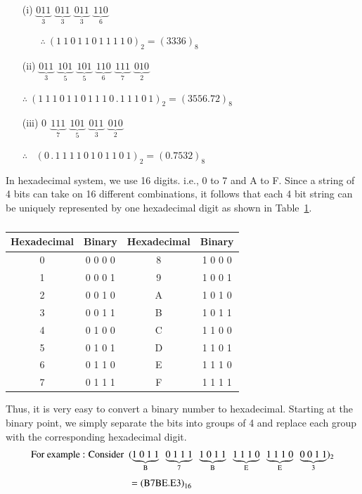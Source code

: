 \begin{solution}
\begin{itemize}
\item[(i)] $\underbrace{011}_{3} \ \ \underbrace{011}_{3} \ \ \underbrace{011}_{3} \ \ \underbrace{110}_{6}$

\smallskip
\qquad\quad~~~ $\therefore~ (1~1~0~1~1~0~1~1~1~1~0)_{2}=(3336)_{8}$

\item[(ii)] $\underbrace{011}_{3} \ \ \underbrace{101}_{5} \ \ \underbrace{101}_{5} \ \ \underbrace{110}_{6} \ \ \underbrace{111}_{7} \ \ \underbrace{010}_{2}$

\smallskip
$\therefore~ (1~1~1~0~1~1~0~1~1~1~0\,.\,1~1~1~0~1)_{2}=(3556.72)_{8}$

\item[(iii)] $0 \ \ \underbrace{111}_{7} \ \ \underbrace{101}_{5} \ \ \underbrace{011}_{3} \ \ \underbrace{010}_{2}$

\smallskip
$\therefore$~ $(0\,.\,1~1~1~1~0~1~0~1~1~0~1)_{2}=(0.7532)_{8}$
\end{itemize}
\end{solution}


In hexadecimal system, we use 16 digits. i.e., 0 to 7 and A to F. Since a string of 4 bits can take on 16 different combinations, it follows that each 4 bit string can be uniquely represented by one hexadecimal digit as shown in Table~\ref{tab5.2}.
\begin{table}[H]
\centering
\caption{}\label{tab5.2}
\renewcommand{\arraystretch}{1.2}
\tabcolsep=10pt
\begin{tabular}{|c|c|c|c|}
\hline
{\bf Hexadecimal} & {\bf Binary} & {\bf Hexadecimal} & {\bf Binary}\\[3pt]
\hline
0 & 0 0 0 0 & 8 & 1 0 0 0\\
1 & 0 0 0 1 & 9 & 1 0 0 1\\
2 & 0 0 1 0 & A & 1 0 1 0\\
3 & 0 0 1 1 & B & 1 0 1 1\\
4 & 0 1 0 0 & C & 1 1 0 0\\
5 & 0 1 0 1 & D & 1 1 0 1\\
6 & 0 1 1 0 & E & 1 1 1 0\\
7 & 0 1 1 1 & F & 1 1 1 1\\
\hline
\end{tabular}
\end{table}

Thus, it is very easy to convert a binary number to hexadecimal. Starting at the binary point, we simply separate the bits into groups of 4 and replace each group with the corresponding hexadecimal digit.
\begin{align*}
\text{For example~: Consider~ } & (\underbrace{1~0~1~1}_{\rmB} \ \ \underbrace{0~1~1~1}_{7} \ \ \underbrace{1~0~1~1}_{\rmB} \ \ \underbrace{1~1~1~0}_{\rmE} \ \ \underbrace{1~1~1~0}_{\rmE} \ \ \underbrace{0~0~1~1}_{3})_{2}\\[3pt]
&= \text{(B7BE.E3)}_{16} 
\end{align*}

